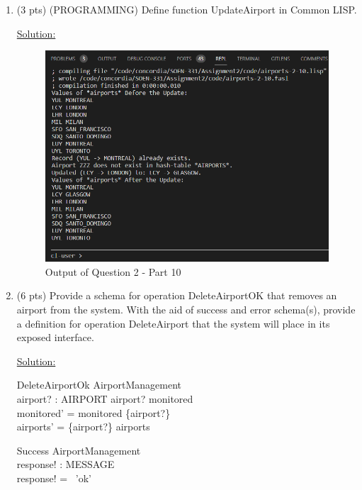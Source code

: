 \documentclass[12pt]{article}
\begin{document}
\begin{spacing}{1.5}
\begin{enumerate}
        \item (3 pts) (PROGRAMMING) Define function UpdateAirport in Common LISP.

        \underline{Solution:}
        

        \begin{figure}[htp]
            \centering
            \includegraphics[width=1\textwidth]{static/airports-2-10.PNG}
            \caption{Output of Question 2 - Part 10}
        \end{figure}

        \newpage
        \item (6 pts) Provide a schema for operation DeleteAirportOK that removes an airport
        from the system. With the aid of success and error schema(s), provide a definition for
        operation DeleteAirport that the system will place in its exposed interface.

        \underline{Solution:}

        \begin{schema}{DeleteAirportOk}
            \Delta AirportManagement \\
            airport? : AIRPORT
            \where
            airport? \in monitored \\
            monitored' = monitored \setminus \{airport?\} \\
            airports' = \{airport?\} \ndres  airports
        \end{schema}

        \begin{schema}{Success}
            \Xi AirportManagement \\
            response! : MESSAGE \\
            \where
            response! = \, 'ok' \\
        \end{schema}


\end{enumerate}
\end{spacing}
\end{document}
